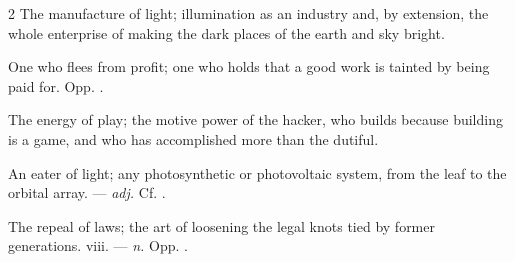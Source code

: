 \begin{multicols}{2}
 The manufacture of light; illumination as an industry and, by extension, the whole enterprise of making the dark places of the earth and sky bright.

 One who flees from profit; one who holds that a good work is tainted by being paid for. Opp. .

 The energy of play; the motive power of the hacker, who builds because building is a game, and who has accomplished more than the dutiful.  

 An eater of light; any photosynthetic or photovoltaic system, from the leaf to the orbital array. —  \textit{adj.} Cf. .

 The repeal of laws; the art of loosening the legal knots tied by former generations.   viii. —  \textit{n.} Opp. .

\end{multicols}

